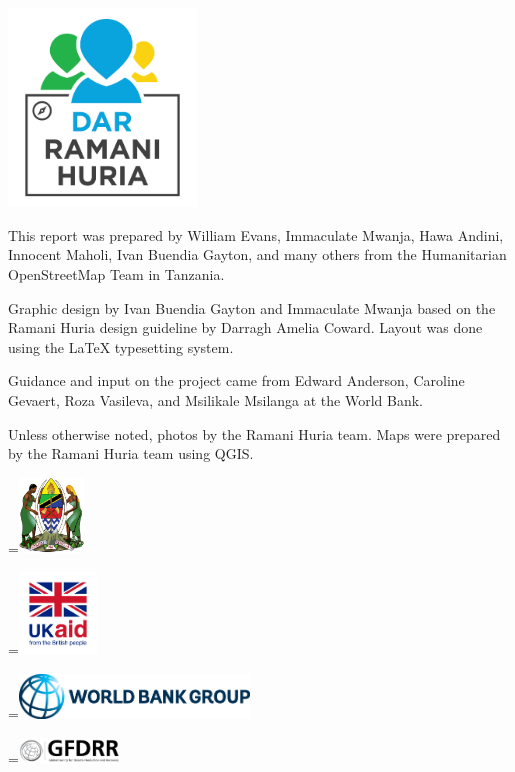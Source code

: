 \documentclass[a4paper,12pt,twoside]{article}
\newcommand*{\vcenteredhbox}[1]{\begingroup
\setbox0=\hbox{#1}\parbox{\wd0}{\box0}\endgroup} %
\begin{document}
\newpage
\color{RHgrey}

\begin{center}
{\includegraphics[width=5cm]{Dar_Ramani_Huria_logo.png}}
\end{center}

This report was prepared by William Evans, Immaculate Mwanja, Hawa Andini, Innocent Maholi, Ivan Buendia Gayton, and many others from the Humanitarian OpenStreetMap Team in Tanzania.

\medskip

Graphic design by Ivan Buendia Gayton and Immaculate Mwanja based on the Ramani Huria design guideline by Darragh Amelia Coward. Layout was done using the \LaTeX { } typesetting system.

\medskip

Guidance and input on the project came from Edward Anderson, Caroline Gevaert, Roza Vasileva, and Msilikale Msilanga at the World Bank.

\medskip

Unless otherwise noted, photos by the Ramani Huria team. Maps were prepared by the Ramani Huria team using QGIS.

\bigskip\bigskip\bigskip\bigskip\bigskip

\vcenteredhbox{\includegraphics[height=2cm]{images/logo_Coat_of_arms_of_Tanzania.png}}
\vcenteredhbox{\includegraphics[height=2.2cm]{UK-aid_logo.png}}
\vcenteredhbox{\includegraphics[height=1.2cm]{images/World_Bank_Group_logo.png}}
\vcenteredhbox{\includegraphics[height=0.7cm]{images/logo_GFDRR.png}}
\end{document}
